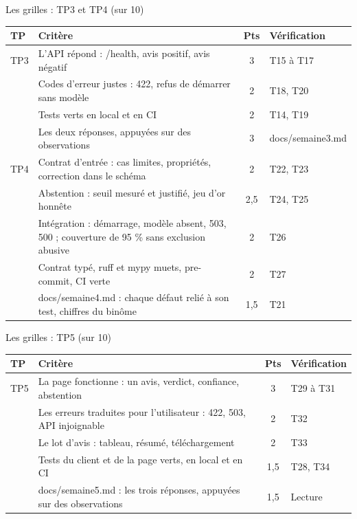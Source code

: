 \documentclass[aspectratio=169,11pt]{beamer}
\newcommand{\co}[1]{{\ttfamily\hyphenchar\font=45\relax #1}}
\begin{document}
\begin{frame}{Les grilles : TP3 et TP4 (sur 10)}
\scriptsize
\begin{tabularx}{\textwidth}{@{}l X c l@{}}
\toprule
\textbf{TP} & \textbf{Critère} & \textbf{Pts} & \textbf{Vérification} \\
\midrule
TP3 & L'API répond : \co{/health}, avis positif, avis négatif & 3 & T15 à T17 \\
    & Codes d'erreur justes : 422, refus de démarrer sans modèle & 2 & T18, T20 \\
    & Tests verts en local et en CI & 2 & T14, T19 \\
    & Les deux réponses, appuyées sur des observations & 3 & \co{docs/semaine3.md} \\
\midrule
TP4 & Contrat d'entrée : cas limites, propriétés, correction dans le schéma & 2 & T22, T23 \\
    & Abstention : seuil mesuré et justifié, jeu d'or honnête & 2,5 & T24, T25 \\
    & Intégration : démarrage, modèle absent, 503, 500 ; couverture de 95 \% sans exclusion abusive & 2 & T26 \\
    & Contrat typé, ruff et mypy muets, pre-commit, CI verte & 2 & T27 \\
    & \co{docs/semaine4.md} : chaque défaut relié à son test, chiffres du binôme & 1,5 & T21 \\
\bottomrule
\end{tabularx}
\end{frame}

\begin{frame}{Les grilles : TP5 (sur 10)}
\scriptsize
\begin{tabularx}{\textwidth}{@{}l X c l@{}}
\toprule
\textbf{TP} & \textbf{Critère} & \textbf{Pts} & \textbf{Vérification} \\
\midrule
TP5 & La page fonctionne : un avis, verdict, confiance, abstention & 3 & T29 à T31 \\
    & Les erreurs traduites pour l'utilisateur : 422, 503, API injoignable & 2 & T32 \\
    & Le lot d'avis : tableau, résumé, téléchargement & 2 & T33 \\
    & Tests du client et de la page verts, en local et en CI & 1,5 & T28, T34 \\
    & \co{docs/semaine5.md} : les trois réponses, appuyées sur des observations & 1,5 & Lecture \\
\bottomrule
\end{tabularx}
\end{frame}
\end{document}
